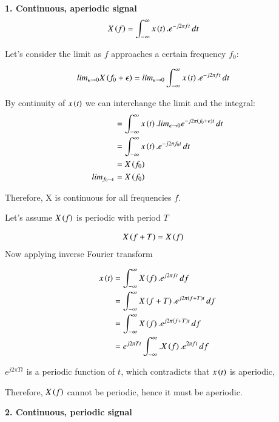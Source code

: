 \documentclass[journal,12pt,onecolumn]{IEEEtran}
\theoremstyle{remark}
\begin{document}
\textbf{1. Continuous, aperiodic signal}\\

\begin{align}
X\left(f\right)&=\int_{-\infty}^{\infty} x\left(t\right).e^{-j2\pi ft}\,dt
\end{align}

Let's consider the limit as $f$ approaches a certain frequency $f_0$:

\begin{align}
lim_{\epsilon \rightarrow 0}X\left(f_0+\epsilon\right)&= lim_{\epsilon \rightarrow 0}\int_{-\infty}^{\infty} x\left(t\right).e^{-j2\pi ft}\,dt
\end{align}

By continuity of $x\left(t\right)$ we can interchange the limit and the integral:
\begin{align}
&=\int_{-\infty}^{\infty} x\left(t\right).lim_{\epsilon\rightarrow0}e^{-j2\pi\left(f_0+\epsilon\right)t}\,dt\\
&=\int_{-\infty}^{\infty} x\left(t\right).e^{-j2\pi f_0 t}\,dt\\
&=X\left(f_0\right)\\
 lim_{f_0-\epsilon}&=X\left(f_0\right)
\end{align}

Therefore, X is continuous for all frequencies $f$.

Let's assume $X\left(f\right)$ is periodic with period $T$ 

\begin{align}
X\left(f+T\right)&=X\left(f\right)
\end{align}
Now applying inverse Fourier transform

\begin{align}
x\left(t\right)&=\int_{-\infty}^{\infty} X\left(f\right).e^{j2\pi ft}\,df\\
&=\int_{-\infty}^{\infty} X\left(f+T\right).e^{j2\pi \left(f+T\right)t}\,df\\
&=\int_{-\infty}^{\infty} X\left(f\right).e^{j2\pi \left(f+T\right)t}\,df\\
&=e^{j2\pi Tt}\int_{-\infty}^{\infty}.X\left(f\right).e^{2\pi ft}\, df
\end{align}

$e^{j2\pi Tt}$ is a periodic function of $t$, which contradicts that $x\left(t\right)$ is aperiodic,

Therefore, $X\left(f\right)$ cannot be periodic, hence it must be aperiodic.

\vspace{2mm}

\textbf{2. Continuous, periodic signal}\\
\end{document}
